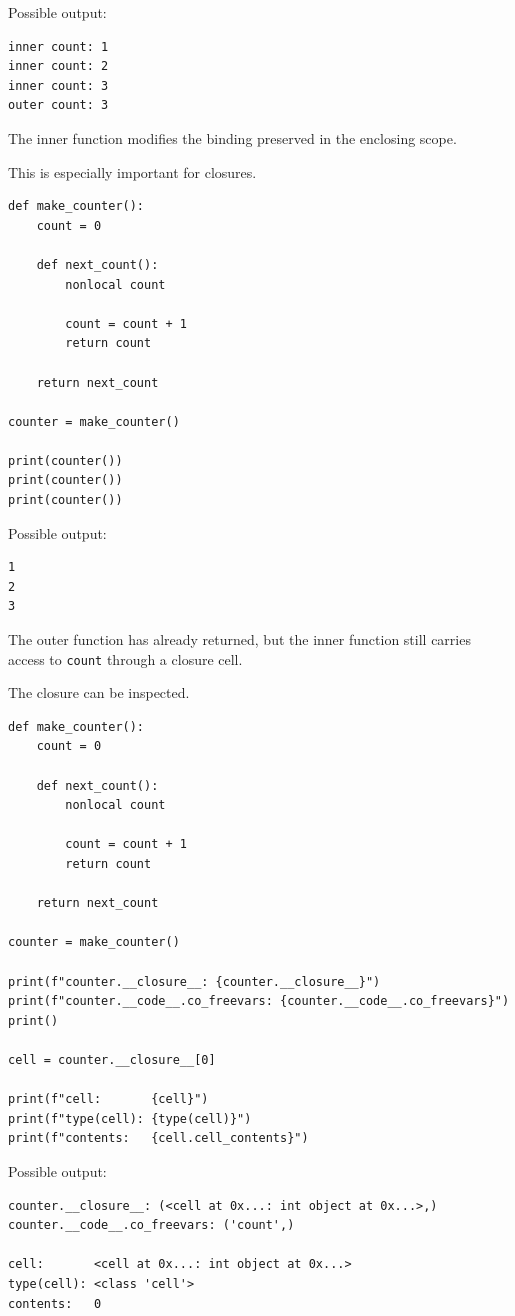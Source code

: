 Possible output:

\begin{verbatim}
inner count: 1
inner count: 2
inner count: 3
outer count: 3
\end{verbatim}

The inner function modifies the binding preserved in the enclosing scope.

This is especially important for closures.

\begin{verbatim}
def make_counter():
    count = 0

    def next_count():
        nonlocal count

        count = count + 1
        return count

    return next_count

counter = make_counter()

print(counter())
print(counter())
print(counter())
\end{verbatim}

Possible output:

\begin{verbatim}
1
2
3
\end{verbatim}

The outer function has already returned, but the inner function still carries access to \texttt{count} through a closure cell.

The closure can be inspected.

\begin{verbatim}
def make_counter():
    count = 0

    def next_count():
        nonlocal count

        count = count + 1
        return count

    return next_count

counter = make_counter()

print(f"counter.__closure__: {counter.__closure__}")
print(f"counter.__code__.co_freevars: {counter.__code__.co_freevars}")
print()

cell = counter.__closure__[0]

print(f"cell:       {cell}")
print(f"type(cell): {type(cell)}")
print(f"contents:   {cell.cell_contents}")
\end{verbatim}

Possible output:

\begin{verbatim}
counter.__closure__: (<cell at 0x...: int object at 0x...>,)
counter.__code__.co_freevars: ('count',)

cell:       <cell at 0x...: int object at 0x...>
type(cell): <class 'cell'>
contents:   0
\end{verbatim}

